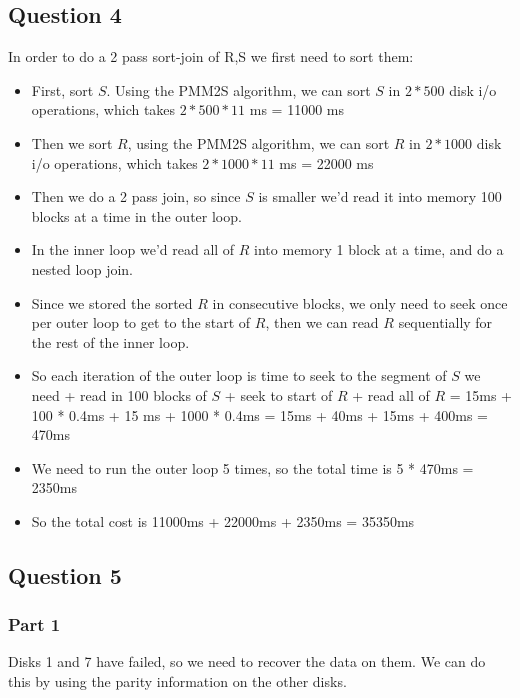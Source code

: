 \documentclass[
  letterpaper,
  DIV=11,
  numbers=noendperiod]{scrartcl}
\providecommand{\tightlist}{%
  \setlength{\itemsep}{0pt}\setlength{\parskip}{0pt}}\usepackage{longtable,booktabs,array}
\begin{document}
\hypertarget{question-4}{%
\subsection{Question 4}\label{question-4}}

In order to do a 2 pass sort-join of R,S we first need to sort them:

\begin{itemize}
\tightlist
\item
  First, sort \(S\). Using the PMM2S algorithm, we can sort \(S\) in
  \(2 * 500\) disk i/o operations, which takes \(2 * 500 * 11\) ms =
  11000 ms
\item
  Then we sort \(R\), using the PMM2S algorithm, we can sort \(R\) in
  \(2* 1000\) disk i/o operations, which takes \(2 * 1000 * 11\) ms =
  22000 ms
\item
  Then we do a 2 pass join, so since \(S\) is smaller we'd read it into
  memory 100 blocks at a time in the outer loop.
\item
  In the inner loop we'd read all of \(R\) into memory 1 block at a
  time, and do a nested loop join.
\item
  Since we stored the sorted \(R\) in consecutive blocks, we only need
  to seek once per outer loop to get to the start of \(R\), then we can
  read \(R\) sequentially for the rest of the inner loop.
\item
  So each iteration of the outer loop is time to seek to the segment of
  \(S\) we need + read in 100 blocks of \(S\) + seek to start of \(R\) +
  read all of \(R\) = 15ms + 100 * 0.4ms + 15 ms + 1000 * 0.4ms = 15ms +
  40ms + 15ms + 400ms = 470ms
\item
  We need to run the outer loop 5 times, so the total time is 5 * 470ms
  = 2350ms
\item
  So the total cost is 11000ms + 22000ms + 2350ms = 35350ms
\end{itemize}

\hypertarget{question-5}{%
\subsection{Question 5}\label{question-5}}

\hypertarget{part-1-1}{%
\subsubsection{Part 1}\label{part-1-1}}

Disks 1 and 7 have failed, so we need to recover the data on them. We
can do this by using the parity information on the other disks.
\end{document}

